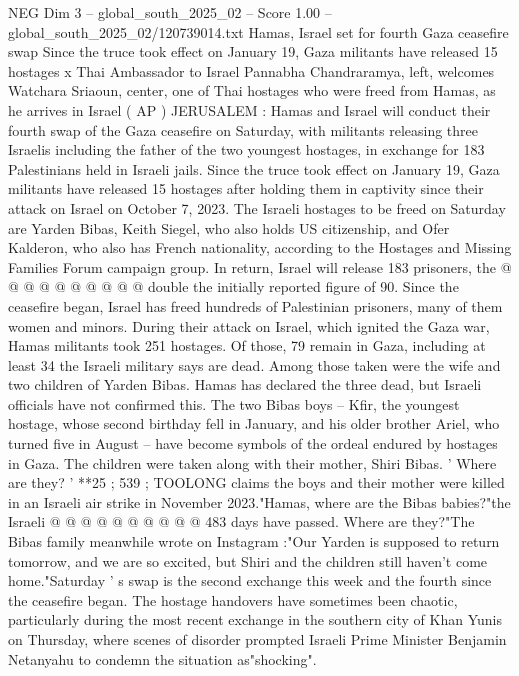 \begin{textsample}{NEG Dim 3 – global\_south\_2025\_02 – Score 1.00 – global\_south\_2025\_02/120739014.txt}  \label{ex:f3_neg_043}
Hamas, Israel set for fourth Gaza ceasefire swap Since the truce took effect on January 19, Gaza militants have released 15 hostages x Thai Ambassador to Israel Pannabha Chandraramya, left, welcomes Watchara Sriaoun, center, one of Thai hostages who were freed from Hamas, as he arrives in Israel ( AP ) JERUSALEM : Hamas and Israel will conduct their fourth swap of the Gaza ceasefire on Saturday, with militants releasing three Israelis including the father of the two youngest hostages, in exchange for 183 Palestinians held in Israeli jails.
Since the truce took effect on January 19, Gaza militants have released 15 hostages after holding them in captivity since their attack on Israel on October 7, 2023.
The Israeli hostages to be freed on Saturday are Yarden Bibas, Keith Siegel, who also holds US citizenship, and Ofer Kalderon, who also has French nationality, according to the Hostages and Missing Families Forum campaign group.
In return, Israel will release 183 prisoners, the @ @ @ @ @ @ @ @ @ @ double the initially reported figure of 90.
Since the ceasefire began, Israel has freed hundreds of Palestinian prisoners, many of them women and minors.
During their attack on Israel, which ignited the Gaza war, Hamas militants took 251 hostages.
Of those, 79 remain in Gaza, including at least 34 the Israeli military says are dead.
Among those taken were the wife and two children of Yarden Bibas.
Hamas has declared the three dead, but Israeli officials have not confirmed this.
The two Bibas boys -- Kfir, the youngest hostage, whose second birthday fell in January, and his older brother Ariel, who turned five in August -- have become symbols of the ordeal endured by hostages in Gaza.
The children were taken along with their mother, Shiri Bibas. ' Where are they? ' **25 ; 539 ; TOOLONG claims the boys and their mother were killed in an Israeli air strike in November 2023."Hamas, where are the Bibas babies?"the Israeli @ @ @ @ @ @ @ @ @ @ 483 days have passed.
Where are they?"The Bibas family meanwhile wrote on Instagram :"Our Yarden is supposed to return tomorrow, and we are so excited, but Shiri and the children still haven't come home."Saturday ' s swap is the second exchange this week and the fourth since the ceasefire began.
The hostage handovers have sometimes been chaotic, particularly during the most recent exchange in the southern city of Khan Yunis on Thursday, where scenes of disorder prompted Israeli Prime Minister Benjamin Netanyahu to condemn the situation as"shocking".

\end{textsample}
